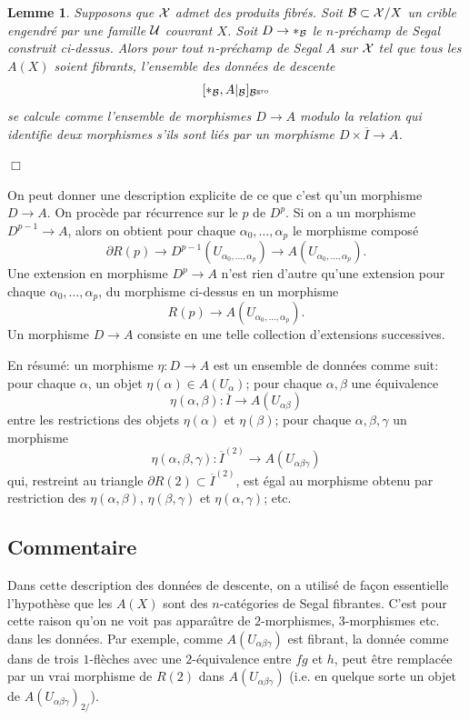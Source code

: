 \documentclass[12pt]{article}
\newcommand{\subnumero}[1]{\subsection*{#1}\phantomsection\addcontentsline{toc}{subsection}{#1}}
\newcommand{\eop}{\hfill $\Box$\vspace{.1in}}
\newtheorem{lemme}[lemma]{Lemme}
\newcommand{\Bb}{{\cal B}}
\newcommand{\Uu}{{\cal U}}
\newcommand{\Xx}{{\cal X}}
\begin{document}
\begin{lemme}
\label{calcdonnees}
Supposons que $\Xx$ admet des produits fibr\'es.
Soit $\Bb \subset \Xx /X$ un crible engendr\'e par une famille $\Uu$
couvrant $X$. Soit $D\rightarrow \ast _{\Bb}$ le $n$-pr\'echamp de Segal
construit ci-dessus. Alors pour tout $n$-pr\'echamp de Segal $A$ sur $\Xx$ tel
que tous les $A(X)$ soient fibrants, l'ensemble des donn\'ees de descente
$$
[\ast _{\Bb}, A|_{\Bb}]_{\Bb ^{\rm gro}}
$$
se calcule comme l'ensemble de morphismes $D\rightarrow A$ modulo la relation
qui identifie deux morphismes s'ils sont li\'es par un morphisme
$D\times \overline{I}\rightarrow A$.
\end{lemme}
\eop

On peut donner une description explicite de ce que c'est qu'un morphisme
$D\rightarrow A$. On proc\`ede par r\'ecurrence sur le $p$ de $D^p$. Si on a un
morphisme $D^{p-1}\rightarrow A$, alors on obtient pour chaque
$\alpha _0,\ldots , \alpha _p$ le morphisme compos\'e
$$
\partial R(p)\rightarrow D^{p-1}(U_{\alpha _0,\ldots ,\alpha _p})\rightarrow
A(U_{\alpha _0,\ldots ,\alpha _p}).
$$
Une extension en morphisme $D^p\rightarrow A$ n'est rien d'autre qu'une
extension pour chaque $\alpha _0,\ldots , \alpha _p$, du morphisme ci-dessus en
un morphisme
$$
R(p)\rightarrow
A(U_{\alpha _0,\ldots ,\alpha _p}).
$$
Un morphisme $D\rightarrow A$ consiste en une telle collection
d'extensions successives.

En r\'esum\'e: un morphisme $\eta : D\rightarrow A$ est un ensemble de
donn\'ees comme suit:
pour chaque $\alpha$, un objet
$\eta (\alpha )\in A(U_{\alpha})$; pour chaque $\alpha , \beta$ une
\'equivalence
$$
\eta (\alpha , \beta ): \overline{I}\rightarrow A(U_{\alpha \beta})
$$
entre les restrictions des objets $\eta (\alpha )$ et $\eta (\beta )$;
pour chaque $\alpha , \beta , \gamma$ un morphisme
$$
\eta (\alpha , \beta , \gamma ):
\overline{I}^{(2)}\rightarrow A(U_{\alpha \beta\gamma})
$$
qui, restreint au triangle $\partial R(2) \subset \overline{I}^{(2)}$,
est \'egal au morphisme obtenu par restriction des $\eta (\alpha ,\beta )$,
$\eta (\beta , \gamma )$ et $\eta (\alpha , \gamma )$; etc.


\subnumero{Commentaire}
Dans cette description des donn\'ees de descente, on a
utilis\'e de fa\c{c}on essentielle l'hypoth\`ese que les $A(X)$ sont des
$n$-cat\'egories de Segal fibrantes. C'est pour cette
raison qu'on ne voit pas appara\^{\i}tre de $2$-morphismes, $3$-morphismes
etc.
dans les donn\'ees. Par exemple, comme $A(U_{\alpha \beta \gamma})$ est
fibrant, la donn\'ee comme dans \cite{Breen} de trois $1$-fl\`eches
avec une $2$-\'equivalence entre $fg$ et $h$, peut \^etre remplac\'ee par
un vrai morphisme de $R(2)$ dans $A(U_{\alpha \beta \gamma})$
(i.e. en quelque sorte un objet de $A(U_{\alpha \beta \gamma})_{2/}$).
\end{document}
